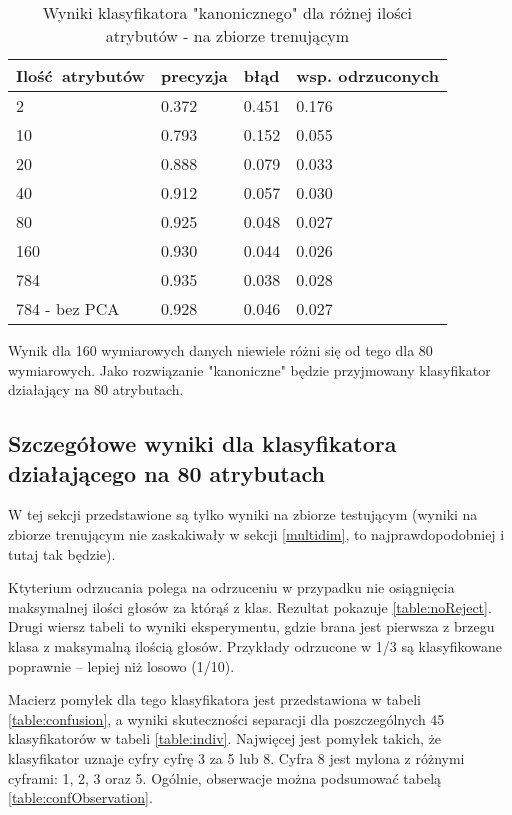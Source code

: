 \documentclass[a4paper]{article}
\begin{document}
\begin{table}[H]
    \caption{Wyniki klasyfikatora "kanonicznego" dla różnej ilości atrybutów - na zbiorze trenującym
    \label{table:attrCountTrain}
    }
\begin{center}
    \begin{tabular}{| l | l | l | l |}
    \hline
        Ilość atrybutów & precyzja & błąd & wsp. odrzuconych \\
    \hline
        2  & 0.372 & 0.451 & 0.176 \\
        10 & 0.793 & 0.152 & 0.055 \\
        20 & 0.888 & 0.079 & 0.033 \\
        40 & 0.912 & 0.057 & 0.030 \\
        80 & 0.925 & 0.048 & 0.027 \\
        160& 0.930 & 0.044 & 0.026 \\
        784& 0.935 & 0.038 & 0.028 \\
        784 - bez PCA & 0.928 & 0.046 & 0.027 \\
    \hline
    \end{tabular}
\end{center}
\end{table}

Wynik dla 160 wymiarowych danych niewiele różni się od tego dla 80 wymiarowych.
Jako rozwiązanie "kanoniczne" będzie przyjmowany klasyfikator działający na 80 atrybutach.

\subsection{Szczegółowe wyniki dla klasyfikatora działającego na 80 atrybutach}

W tej sekcji przedstawione są tylko wyniki na zbiorze testującym
(wyniki na zbiorze trenującym nie zaskakiwały w sekcji \ref{multidim}, to najprawdopodobniej i tutaj tak będzie).

Ktyterium odrzucania polega na odrzuceniu w przypadku nie osiągnięcia maksymalnej ilości głosów za którąś z klas.
Rezultat pokazuje \ref{table:noReject}.
Drugi wiersz tabeli to wyniki eksperymentu, gdzie brana jest pierwsza z brzegu klasa z maksymalną ilością głosów.
Przykłady odrzucone w 1/3 są klasyfikowane poprawnie -- lepiej niż losowo (1/10).


Macierz pomyłek dla tego klasyfikatora jest przedstawiona w tabeli \ref{table:confusion},
a wyniki skuteczności separacji dla poszczególnych 45 klasyfikatorów w tabeli \ref{table:indiv}.
Najwięcej jest pomyłek takich, że klasyfikator uznaje cyfry cyfrę 3 za 5 lub 8.
Cyfra 8 jest mylona z różnymi cyframi: 1, 2, 3 oraz 5.
Ogólnie, obserwacje można podsumować tabelą \ref{table:confObservation}.
\end{document}
